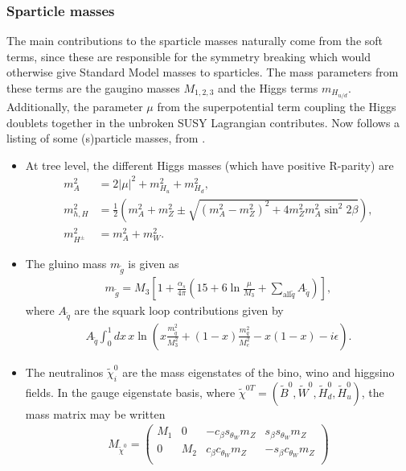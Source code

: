 \documentclass[twoside,english]{uiofysmaster}
\begin{document}
 \subsubsection{Sparticle masses}
 The main contributions to the sparticle masses naturally come from the soft terms, since these are responsible for the symmetry breaking which would otherwise give Standard Model masses to sparticles. The mass parameters from these terms are the gaugino masses $M_{1,2,3}$ and the Higgs terms $m_{H_{u/d}}$. Additionally, the parameter $\mu$ from the superpotential term coupling the Higgs doublets together in the unbroken SUSY Lagrangian contributes. Now follows a listing of some (s)particle masses, from \cite{Batzing:2013}.
 \begin{itemize}
 	\item At tree level, the different Higgs masses (which have positive R-parity) are
 	\begin{align}
 		m_A^2 &= 2|\mu|^2 + m^2_{H_u} + m^2_{H_d},\nonumber\\
 		m^2_{h,H} &= \frac{1}{2} \left( m_A^2 + m_Z^2 \pm \sqrt{(m_A^2 - m_Z^2)^2 + 4m_Z^2m_A^2\sin^2 2\beta} \right),\\
 		m^2_{H^\pm} &= m_A^2 + m_W^2.\nonumber
 	\end{align}
 	\item The gluino mass $m_{\tilde g}$ is given as
 	\begin{align}
 		m_{\tilde g} = M_3 \left[ 1 + \frac{\alpha_s}{4\pi}\left( 15 + 6\ln\frac{\mu}{M_3} + \sum_{\mathrm{all} \tilde q} A_{\tilde q} \right)\right],
 	\end{align}
 	where $A_{\tilde q}$ are the squark loop contributions given by
 	\begin{align}
 		A_{\tilde q} \int_0^1 dx \, x \ln\left( x \frac{m^2_{\tilde q}}{M_3^2} + (1-x)\frac{m_q^2}{M_e^2} - x(1-x) - i\epsilon \right).
 	\end{align}
 	\item The neutralinos $\tilde\chi_i^0$ are the mass eigenstates of the bino, wino and higgsino fields. In the gauge eigenstate basis, where $\tilde\chi^{0T} = (\tilde B^0, \tilde W^0, \tilde H_d^0, \tilde H_u^0)$, the mass matrix may be written
 	\begin{align}
 		M_{\tilde \chi^0} = \begin{pmatrix}
 			M_1 & 0 & - c_\beta s_{\theta_W} m_Z &  s_\beta s_{\theta_W} m_Z \\
 			0 & M_2 &  c_\beta c_{\theta_W} m_Z & - s_\beta c_{\theta_W} m_Z\\

\end{pmatrix}
\end{align}
\end{itemize}
\end{document}
